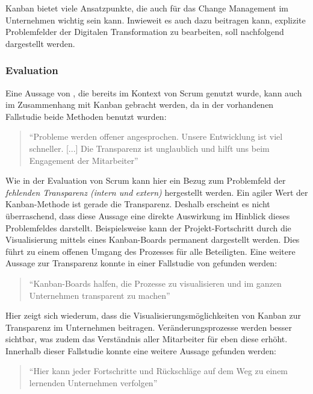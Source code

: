 Kanban bietet viele Ansatzpunkte, die auch für das Change Management im Unternehmen wichtig sein kann. Inwieweit es auch dazu beitragen kann, explizite Problemfelder der Digitalen Transformation zu bearbeiten, soll nachfolgend dargestellt werden.

\subsubsection{Evaluation}

Eine Aussage von , die bereits im Kontext von Scrum genutzt wurde, kann auch im Zusammenhang mit Kanban gebracht werden, da in der vorhandenen Fallstudie beide Methoden benutzt wurden:

\begin{quote}
	``Probleme werden offener angesprochen. Unsere Entwicklung ist viel schneller. [...] Die Transparenz ist unglaublich und hilft uns beim Engagement der Mitarbeiter'' \cite[S. 5]{fuchs_adapting_2019}
\end{quote}

Wie in der Evaluation von Scrum kann hier ein Bezug zum Problemfeld der \textit{fehlenden Transparenz (intern und extern)} hergestellt werden. Ein agiler Wert der Kanban-Methode ist gerade die Transparenz. Deshalb erscheint es nicht überraschend, dass diese Aussage eine direkte Auswirkung im Hinblick dieses Problemfeldes darstellt. Beispielsweise kann der Projekt-Fortschritt durch die Visualisierung mittels eines Kanban-Boards permanent dargestellt werden. Dies führt zu einem offenen Umgang des Prozesses für alle Beteiligten. Eine weitere Aussage zur Transparenz konnte in einer Fallstudie von  gefunden werden:

\begin{quote}
	``Kanban-Boards halfen, die Prozesse zu visualisieren und im ganzen Unternehmen transparent zu machen'' \cite[S. 213]{hofert_agile_2018}
\end{quote}

Hier zeigt sich wiederum, dass die Visualisierungsmöglichkeiten von Kanban zur Transparenz im Unternehmen beitragen. Veränderungsprozesse werden besser sichtbar, was zudem das Verständnis aller Mitarbeiter für eben diese erhöht. Innerhalb dieser Fallstudie konnte eine weitere Aussage gefunden werden:

\begin{quote}
	``Hier kann jeder Fortschritte und Rückschläge auf dem Weg zu einem lernenden Unternehmen verfolgen'' \cite[S. 212]{fuchs_adapting_2019}
\end{quote}

